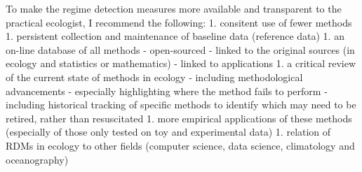 \documentclass[12pt,twoside,openany]{reedthesis}
\begin{document}
To make the regime detection measures more available and transparent to the practical ecologist, I recommend the following:
1. consitent use of fewer methods
1. persistent collection and maintenance of baseline data (reference data)
1. an on-line database of all methods
- open-sourced
- linked to the original sources (in ecology and statistics or mathematics)
- linked to applications
1. a critical review of the current state of methods in ecology
- including methodological advancements
- especially highlighting where the method fails to perform
- including historical tracking of specific methods to identify which may need to be retired, rather than resuscitated
1. more empirical applications of these methods (especially of those only tested on toy and experimental data)
1. relation of RDMs in ecology to other fields (computer science, data science, climatology and oceanography)
\end{document}
